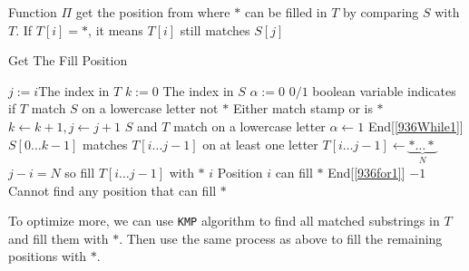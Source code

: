 \documentclass[a4paper,12pt]{article}
\begin{document}
Function $\Pi$ get the position from where $\ast$ can be filled in $T$ by comparing $S$ with $T$. If $T[i]=\ast$, it means $T[i]$ still matches $S[j]$
\begin{algorithm}[H]
\caption{Get The Fill Position}
\begin{algorithmic}[1]
 \label{936for1}
\State $j:=i$\Comment The index in $T$
\State $k:=0$ \Comment The index in $S$
\State $\alpha:=0$ \Comment $0/1$ boolean variable indicates if $T$ match $S$ on a lowercase letter not $\ast$
 \label{936While1}
 \Comment Either match stamp or is $\ast$
\State $k\gets k+1, j\gets j+1$
 \Comment $S$ and $T$ match on a lowercase letter
\State $\alpha\gets 1$
\EndIf
\EndIf
\EndWhile \Comment End[\ref{936While1}]
 \Comment $S[0\ldots k-1]$ matches $T[i\ldots j-1]$ on at least one letter
\State $T[i\ldots j-1] \gets \underbrace{\ast\ldots\ast}_{N}$ \Comment $j-i = N$ so fill $T[i\ldots j-1]$ with $\ast$
\State \Return $i$ \Comment Position $i$ can fill $\ast$
\EndIf
\EndFor \Comment End[\ref{936for1}]
\State \Return $-1$ \Comment Cannot find any position that can fill $\ast$
\EndFunction
\end{algorithmic}
\end{algorithm}
To optimize more, we can use \texttt{KMP} algorithm to find all matched substrings in $T$ and fill them with $\ast$. Then use the same process as above to fill the remaining positions with $\ast$. 
\end{document}
